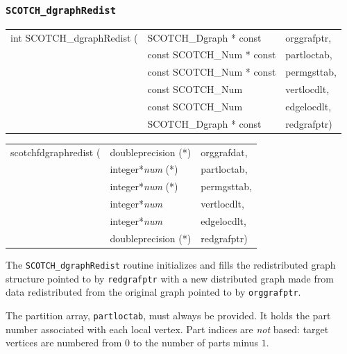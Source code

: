 \subsubsection{{\tt SCOTCH\_dgraphRedist}}
\label{sec-lib-func-dgraphredist}

\begin{itemize}
\progsyn

{\tt\begin{tabular}{l@{}ll}

int SCOTCH\_dgraphRedist ( & SCOTCH\_Dgraph * const    & orggrafptr, \\
                           & const SCOTCH\_Num * const & partloctab, \\
                           & const SCOTCH\_Num * const & permgsttab, \\
                           & const SCOTCH\_Num         & vertlocdlt, \\
                           & const SCOTCH\_Num         & edgelocdlt, \\
                           & SCOTCH\_Dgraph * const    & redgrafptr)
\end{tabular}}

{\tt\begin{tabular}{l@{}ll}
scotchfdgraphredist ( & doubleprecision (*)   & orggrafdat, \\
                      & integer*{\it num} (*) & partloctab, \\
                      & integer*{\it num} (*) & permgsttab, \\
                      & integer*{\it num}     & vertlocdlt, \\
                      & integer*{\it num}     & edgelocdlt, \\
                      & doubleprecision (*)   & redgrafptr)
\end{tabular}}

\progdes

The {\tt SCOTCH\_dgraphRedist} routine initializes and fills the
redistributed graph structure pointed to by
{\tt red\lbt graf\lbt ptr} with a new distributed graph
made from data redistributed from the original
graph pointed to by {\tt org\lbt graf\lbt ptr}.

The partition array, {\tt part\lbt loc\lbt tab}, must always be
provided. It holds the part number associated with each local
vertex. Part indices are {\em not\/} based: target vertices are
numbered from $0$ to the number of parts minus $1$.


\end{itemize}
